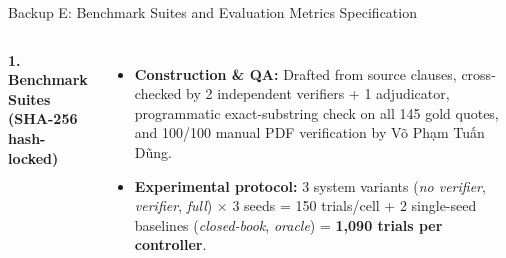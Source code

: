 \documentclass[aspectratio=1610,11pt]{beamer}
\begin{document}
\begin{frame}{Backup E: Benchmark Suites and Evaluation Metrics Specification}
  \begin{columns}[T]
    \scriptsize
    \textbf{1. Benchmark Suites (SHA-256 hash-locked)}
    \vspace{2pt}

    \vspace{4pt}

    \begin{itemize}\scriptsize
      \item \textbf{Construction \& QA:} Drafted from source clauses, cross-checked by 2 independent verifiers + 1 adjudicator, programmatic exact-substring check on all 145 gold quotes, and 100/100 manual PDF verification by Võ Phạm Tuấn Dũng.
      \item \textbf{Experimental protocol:} 3 system variants (\emph{no verifier}, \emph{verifier}, \emph{full}) $\times$ 3 seeds = 150 trials/cell + 2 single-seed baselines (\emph{closed-book}, \emph{oracle}) = \textbf{1,090 trials per controller}.
    \end{itemize}


\end{columns}
\end{frame}
\end{document}
